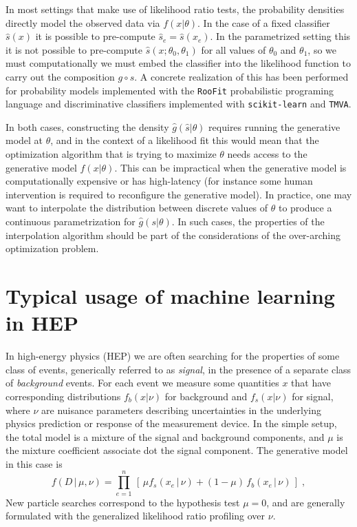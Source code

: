 \documentclass[11pt, oneside]{article}   	%
\begin{document}
In most settings that make use of likelihood ratio tests, the probability densities directly model the observed data via $f(x|\theta)$. In the case of a fixed classifier $\hat s(x)$ it is possible to pre-compute $\hat s_e=\hat s(x_e)$. In the parametrized setting this it is not possible to pre-compute $\hat s(x; \theta_0, \theta_1)$ for all values of $\theta_0$ and $\theta_1$, so we must computationally we must embed the classifier into the likelihood function to carry out the composition $g\circ s$. A concrete realization of this has been performed for probability models implemented with the \texttt{RooFit} probabilistic programing language and discriminative classifiers implemented with \texttt{scikit-learn} and \texttt{TMVA}.

In both cases, constructing the density $\hat g(\hat s|\theta)$ requires running the generative model at $\theta$, and in the context of a likelihood fit this would mean that the optimization algorithm that is trying to maximize $\theta$ needs access to the generative model $f(x|\theta)$. This can be  impractical when the generative model is computationally expensive or has high-latency (for instance some human intervention is required to reconfigure the generative model).  In practice, one may want to interpolate the distribution between discrete values of $\theta$ to produce a continuous parametrization for $\hat g(s | \theta)$. In such cases, the properties of the interpolation algorithm should be part of the considerations of the over-arching optimization problem.

\section{Typical usage of machine learning in HEP}

In high-energy physics (HEP) we are often searching for the properties of some 
class of events, generically referred to as \textit{signal}, in the presence of a separate class 
of \textit{background} events. For each event we measure some quantities $x$ that have corresponding distributions 
$f_b(x|\nu)$ for background and $f_s(x|\nu)$ for signal, where $\nu$ are nuisance parameters describing uncertainties in the underlying physics prediction or response of the measurement device. In the simple setup, the total model is a mixture of the signal and background components, and $\mu$ is the mixture coefficient associate dot the signal component. The generative model in this case is
\begin{equation}\label{eq:hepGen}
f( D \,|\, \mu, \nu) = \prod_{e=1}^n \, \left[\, \mu f_s( x_e \, |\,  \nu)  + (1-\mu)\, f_b( x_e \,|\, \nu) \,\right] \; ,
\end{equation}
New particle searches correspond to the hypothesis test $\mu=0$, and are generally formulated with the
generalized likelihood ratio profiling over $\nu$.
\end{document}

